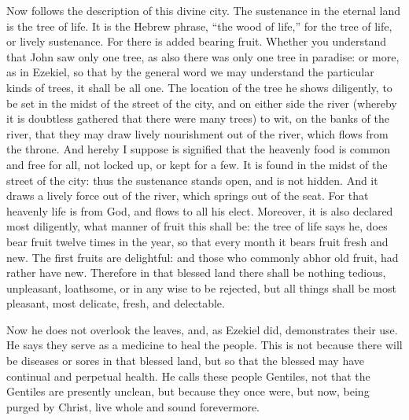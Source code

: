 Now follows the description of this divine city. The sustenance in the eternal land is the tree of life. It is the Hebrew phrase, “the wood of life,” for the tree of life, or lively sustenance. For there is added bearing fruit. Whether you understand that John saw only one tree, as also there was only one tree in paradise: or more, as in Ezekiel, so that by the general word we may understand the particular kinds of trees, it shall be all one. The location of the tree he shows diligently, to be set in the midst of the street of the city, and on either side the river (whereby it is doubtless gathered that there were many trees) to wit, on the banks of the river, that they may draw lively nourishment out of the river, which flows from the throne. And hereby I suppose is signified that the heavenly food is common and free for all, not locked up, or kept for a few. It is found in the midst of the street of the city: thus the sustenance stands open, and is not hidden. And it draws a lively force out of the river, which springs out of the seat. For that heavenly life is from God, and flows to all his elect. Moreover, it is also declared most diligently, what manner of fruit this shall be: the tree of life says he, does bear fruit twelve times in the year, so that every month it bears fruit fresh and new. The first fruits are delightful: and those who commonly abhor old fruit, had rather have new. Therefore in that blessed land there shall be nothing tedious, unpleasant, loathsome, or in any wise to be rejected, but all things shall be most pleasant, most delicate, fresh, and delectable.

Now he does not overlook the leaves, and, as Ezekiel did, demonstrates their use. He says they serve as a medicine to heal the people. This is not because there will be diseases or sores in that blessed land, but so that the blessed may have continual and perpetual health. He calls these people Gentiles, not that the Gentiles are presently unclean, but because they once were, but now, being purged by Christ, live whole and sound forevermore.

